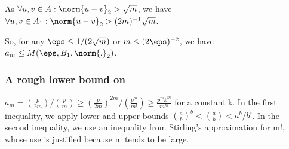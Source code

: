\documentclass{article}
\begin{document}
As $\forall u, v \in A: \norm{u-v}_2 > \sqrt{m}$, we have $\forall u, v \in A_1: \norm{u-v}_2 > (2m)^{-1}\sqrt{m}$.

So, for any $\eps \leq 1/(2 \sqrt{m})$ or $m \leq (2 \eps)^{-2}$, we have  $a_m \leq M(\eps, B_1, \norm{.}_2)$.

\subsubsection{A rough lower bound on }
$a_m = \binom{p}{2m}/ \binom{p}{m} \geq (\frac{p}{2m})^{2m}/(\frac{p^{m}}{m!}) \geq \frac{p^{m}k^{m}}{m^{m}}$ for a constant k. In the first inequality, we apply lower and upper bounds $(\frac{a}{b})^{b} < \binom{a}{b} < a^{b}/b!$. In the second inequality, we use an inequality from Stirling's approximation for m!, whose use is justified because m tends to be large.

% 
% 
\end{document}
